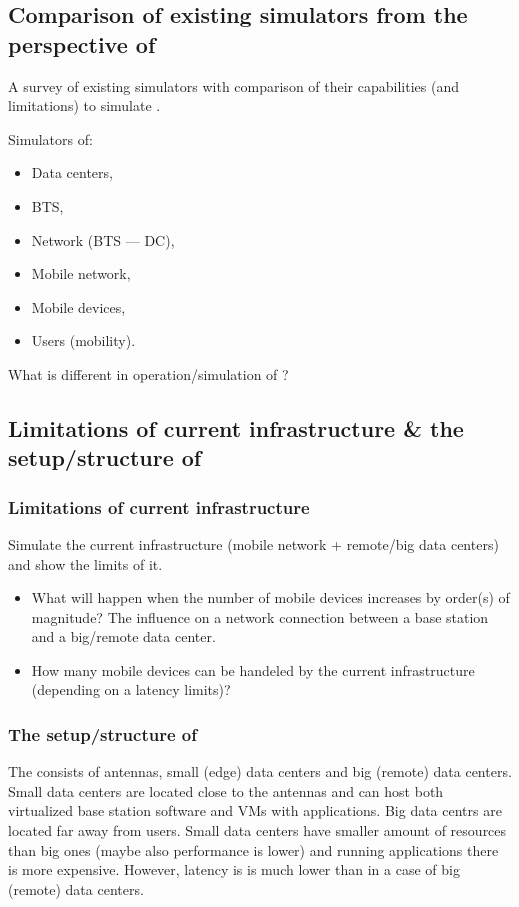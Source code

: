 
\subsection{Comparison of existing simulators from the perspective of  \xcloud}
A survey of existing simulators with comparison of their capabilities (and limitations) to simulate \xcloud.

Simulators of:
\begin{itemize}
\item Data centers,
\item BTS,
\item Network (BTS --- DC),
\item Mobile network,
\item Mobile devices,
\item Users (mobility).
\end{itemize}

What is different in operation/simulation of \xcloud?

\subsection{Limitations of current infrastructure \& the setup/structure of \xcloud}
\subsubsection{Limitations of current infrastructure}
Simulate the current infrastructure (mobile network + remote/big data centers) and show the limits of it.
\begin{itemize}
\item What will happen when the number of mobile devices increases by order(s) of magnitude? The influence on a network connection between a base station and a big/remote data center.
\item How many mobile devices can be handeled by the current infrastructure (depending on a latency limits)?
\end{itemize}
\subsubsection{The setup/structure of \xcloud}
The \xcloud consists of antennas, small (edge) data centers and big (remote) data centers.
Small data centers are located close to the antennas and can host both virtualized base station software and VMs with applications.
Big data centrs are located far away from users.
Small data centers have smaller amount of resources than big ones (maybe also performance is lower) and running applications there is more expensive.
However, latency is is much lower than in a case of big (remote) data centers.

